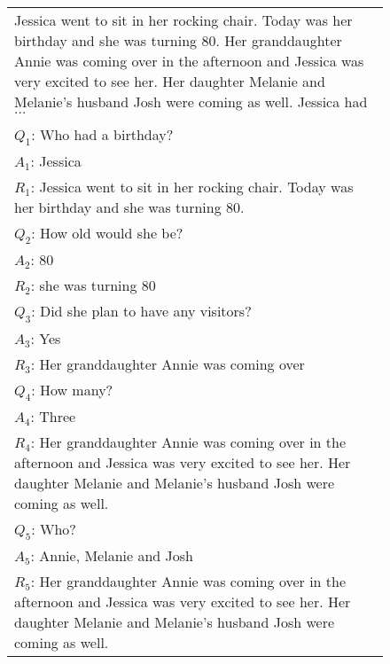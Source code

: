 \begin{figure}[!t]
\begin{tabular}{p{}}
\midrule
Jessica went to sit in her rocking chair. Today was her birthday and she was turning 80. Her granddaughter Annie was coming over in the afternoon and Jessica was very excited to see her. Her daughter Melanie and Melanie's husband Josh were coming as well. Jessica had $\ldots$\\
\\
$Q_1$: Who had a birthday? \\
$A_1$: Jessica \\
$R_1$: Jessica went to sit in her rocking chair. Today was her birthday and she was turning 80.\\
\vspace{0em}
$Q_2$: How old would she be?\\
$A_2$: 80 \\
$R_2$: she was turning 80 \\
\vspace{0em}
$Q_3$: Did she plan to have any visitors?\\
$A_3$: Yes \\
$R_3$: Her granddaughter Annie was coming over \\
\vspace{0em}
$Q_4$: How many?\\
$A_4$: Three \\
$R_4$: Her granddaughter Annie was coming over in the afternoon and Jessica was very excited to see her. Her daughter Melanie and Melanie's husband Josh were coming as well. \\
\vspace{0em}
$Q_5$: Who?\\
$A_5$: Annie, Melanie and Josh \\
$R_5$: Her granddaughter Annie was coming over in the afternoon and Jessica was very excited to see her. Her daughter Melanie and Melanie's husband Josh were coming as well.\\
\bottomrule
\end{tabular}
\end{figure}

